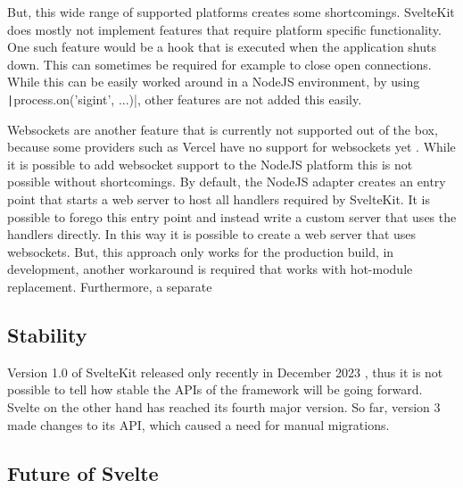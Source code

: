But, this wide range of supported platforms creates some shortcomings. SvelteKit does mostly not implement features that require platform specific functionality. One such feature would be a hook that is executed when the application shuts down. This can sometimes be required for example to close open connections. While this can be easily worked around in a NodeJS environment, by using \texttt|process.on('sigint', ...)|, other features are not added this easily. 

Websockets are another feature that is currently not supported out of the box, because some providers such as Vercel have no support for websockets yet \cite{noauthor_vercel_nodate}. While it is possible to add websocket support to the NodeJS platform this is not possible without shortcomings. By default, the NodeJS adapter creates an entry point that starts a web server to host all handlers required by SvelteKit. It is possible to forego this entry point and instead write a custom server that uses the handlers directly. In this way it is possible to create a web server that uses websockets. But, this approach only works for the production build, in development, another workaround is required that works with hot-module replacement. Furthermore, a separate 


\subsection{Stability}


Version 1.0 of SvelteKit released only recently in December 2023 \cite{team_announcing_2022}, thus it is not possible to tell how stable the APIs of the framework will be going forward. Svelte on the other hand has reached its fourth major version. So far, version 3 made changes to its API, which caused a need for manual migrations. 



\subsection{Future of Svelte}


